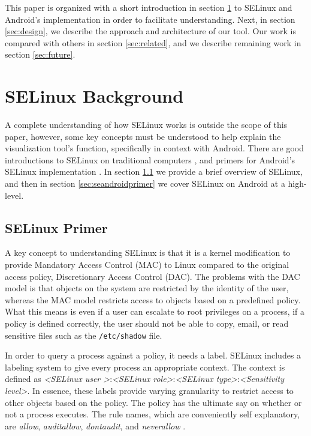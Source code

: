 \documentclass[conference]{IEEEtran}
\begin{document}
This paper is organized with a short introduction in section \ref{sec:selinuxbg} to SELinux and Android's implementation in order to facilitate understanding. Next, in section \ref{sec:design}, we describe the approach and architecture of our tool. Our work is compared with others in section \ref{sec:related}, and we describe remaining work in section \ref{sec:future}.


\section{SELinux Background}\label{sec:selinuxbg}
A complete understanding of how SELinux works is outside the scope of this paper, however, some key concepts must be understood to help explain the visualization tool's function, specifically in context with Android.  There are good introductions to SELinux on traditional computers \cite{vermeulen2013selinux}, and primers for Android's SELinux implementation \cite{elenkov2014android}. In section \ref{sec:selinuxprimer} we provide a brief overview of SELinux, and then in section \ref{sec:seandroidprimer} we cover SELinux on Android at a high-level.

\subsection{SELinux Primer}\label{sec:selinuxprimer}
A key concept to understanding SELinux is that it is a kernel modification to provide Mandatory Access Control (MAC) to Linux compared to the original access policy, Discretionary Access Control (DAC).  The problems with the DAC model is that objects on the system are restricted by the identity of the user, whereas the MAC model restricts access to objects based on a predefined policy.  What this means is even if a user can escalate to root privileges on a process, if a policy is defined correctly, the user should not be able to copy, email, or read sensitive files such as the \verb|/etc/shadow| file.

In order to query a process against a policy, it needs a label.  SELinux includes a labeling system to give every process an appropriate context.  The context is defined as \textit{\textless SELinux user \textgreater}:\textit{\textless SELinux role\textgreater}:\textit{\textless SELinux type\textgreater}:\textit{\textless Sensitivity level\textgreater}.  In essence, these labels provide varying granularity to restrict access to other objects based on the policy.  The policy has the ultimate say on whether or not a process executes.  The rule names, which are conveniently self explanatory, are \textit{allow}, \textit{auditallow}, \textit{dontaudit}, and \textit{neverallow} \cite{AVCRules}.
\end{document}
